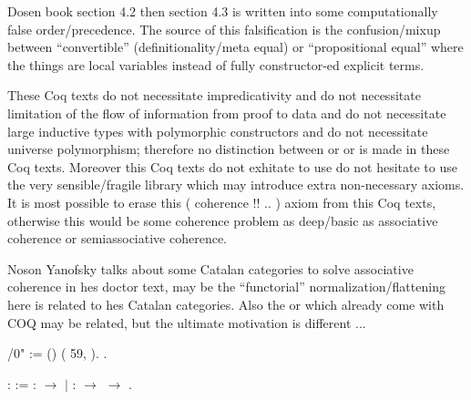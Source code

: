     Dosen book \cite{dosen} section 4.2 then section 4.3 is written into some computationally false order/precedence. The source of this falsification is the confusion/mixup between ``convertible'' (definitionality/meta equal) or ``propositional equal'' where the things are local variables instead of fully constructor-ed explicit terms.


    These Coq texts do not necessitate impredicativity and do not necessitate limitation of the flow of information from proof to data and do not necessitate large inductive types with polymorphic constructors and do not necessitate universe polymorphism; therefore no distinction between  or  or  is made in these Coq texts. Moreover this Coq texts do not exhitate to use do not hesitate to use the very sensible/fragile library    which may introduce extra non-necessary  axioms. It is most possible to erase this  ( coherence !! .. ) axiom from this Coq texts, otherwise this would be some coherence problem as deep/basic as associative coherence or semiassociative coherence.


    Noson Yanofsky talks about some Catalan categories to solve associative coherence in hes doctor text, may be the ``functorial'' normalization/flattening here is related to hes Catalan categories. Also the   or  which already come with COQ may be related, but the ultimate motivation is different ... \begin{coqdoccode}
\coqdocemptyline
\coqdocnoindent
{} /0" := () (  59,  ).\coqdoceol
\coqdocnoindent
{} .\coqdoceol
\end{coqdoccode}
\coqdoceol
\coqdocemptyline
\coqdocnoindent
{}  :  :=\coqdoceol
\coqdocindent{2.00em}
 :  \ensuremath{\rightarrow}  \ensuremath{|}  :  \ensuremath{\rightarrow}  \ensuremath{\rightarrow} .

